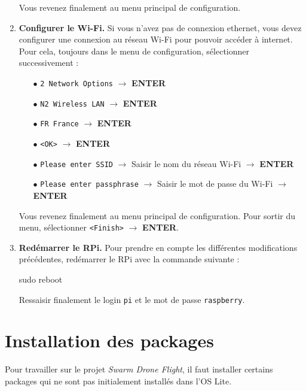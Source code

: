 \documentclass[a4paper, 10pt]{article}
\begin{document}
\begin{enumerate}
	Vous revenez finalement au menu principal de configuration.
	
	\item\textbf{Configurer le Wi-Fi.} Si vous n'avez pas de connexion
	ethernet, vous devez configurer une connexion au réseau Wi-Fi pour
	pouvoir accéder à internet. Pour cela, toujours dans le menu de
	configuration, sélectionner successivement :

	\begin{itemize}
		\item[$\bullet$] \texttt{2 Network Options} 
						 $\rightarrow$ \textbf{ENTER}
		\item[$\bullet$] \texttt{N2 Wireless LAN}
						 $\rightarrow$ \textbf{ENTER}
		\item[$\bullet$] \texttt{FR France}
						 $\rightarrow$ \textbf{ENTER}
		\item[$\bullet$] \texttt{<OK>}
						 $\rightarrow$ \textbf{ENTER}
		\item[$\bullet$] \texttt{Please enter SSID}
						 $\rightarrow$ Saisir le nom du réseau Wi-Fi
						 $\rightarrow$ \textbf{ENTER}	
		\item[$\bullet$] \texttt{Please enter passphrase}
						 $\rightarrow$ Saisir le mot de passe du Wi-Fi
						 $\rightarrow$ \textbf{ENTER}		 		
	\end{itemize}
	
	Vous revenez finalement au menu principal de configuration.
	Pour sortir du menu, sélectionner \texttt{<Finish>}
	$\rightarrow$ \textbf{ENTER}.	

	\item\textbf{Redémarrer le RPi.} Pour prendre en compte les 
	différentes modifications précédentes, redémarrer le RPi avec
	la commande suivante :	
	
\begin{commandshell}
sudo reboot
\end{commandshell}	

	Ressaisir finalement le login \texttt{pi} et le mot de passe \texttt{raspberry}. 
\end{enumerate}

\section{Installation des packages}

Pour travailler sur le projet \textit{Swarm Drone Flight}, il faut
installer certains packages qui ne sont pas initialement installés
dans l'OS Lite.
\end{document}
